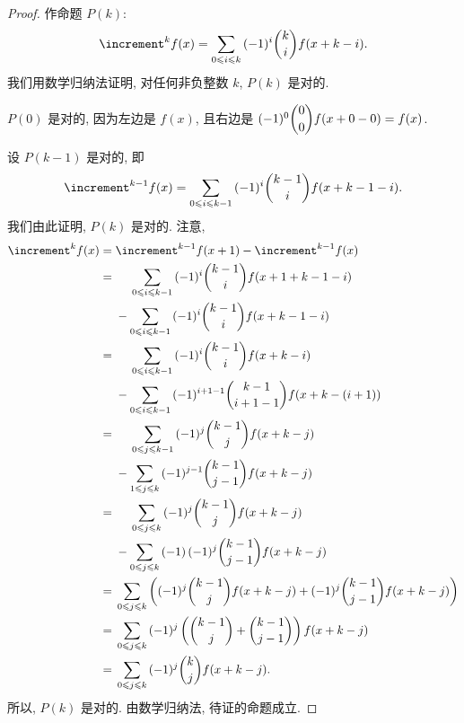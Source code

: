 \documentclass[../libro.tex]{subfiles}
\begin{document}
\begin{proof}
    作命题 \(P(k)\):
    \begin{align*}
        \increment^k f (x)
        = \sum_{0 \leq i \leq k} {(-1)^i \dbinom{k}{i} f(x + k - i)}.
    \end{align*}
    我们用数学归纳法证明, 对任何非负整数 \(k\),
    \(P(k)\) 是对的.

    \(P(0)\) 是对的, 因为左边是 \(f(x)\),
    且右边是 \((-1)^0 \dbinom{0}{0} f(x + 0 - 0) = f(x)\).

    设 \(P(k-1)\) 是对的,
    即
    \begin{align*}
        \increment^{k-1} f (x)
        = \sum_{0 \leq i \leq k-1} {(-1)^i \dbinom{k-1}{i} f(x + k - 1 - i)}.
    \end{align*}
    我们由此证明, \(P(k)\) 是对的.
    注意,
    \begin{align*}
        \increment^k f(x)
        = {} &
        \increment^{k-1} f (x+1) - \increment^{k-1} f (x)
        \\
        = {} &
        \hphantom{{} - {}}
        \sum_{0 \leq i \leq k-1} {(-1)^i \dbinom{k-1}{i} f(x + 1 + k - 1 - i)}
        \\
        &
        {} -
        \sum_{0 \leq i \leq k-1} {(-1)^i \dbinom{k-1}{i} f(x + k - 1 - i)}
        \\
        = {} &
        \hphantom{{} - {}}
        \sum_{0 \leq i \leq k-1} {(-1)^i \dbinom{k-1}{i} f(x + k - i)}
        \\
        &
        {} -
        \sum_{0 \leq i \leq k-1} {(-1)^{i+1-1} \dbinom{k-1}{i+1-1} f(x + k - (i + 1))}
        \\
        = {} &
        \hphantom{{} + {}}
        \sum_{0 \leq j \leq k-1} {(-1)^j \dbinom{k-1}{j} f(x + k - j)}
        \\
        &
        {} -
        \sum_{1 \leq j \leq k} {(-1)^{j-1} \dbinom{k-1}{j-1} f(x + k - j)}
        \\
        = {} &
        \hphantom{{} + {}}
        \sum_{0 \leq j \leq k} {(-1)^j \dbinom{k-1}{j} f(x + k - j)}
        \\
        &
        {} -
        \sum_{0 \leq j \leq k} {(-1)\, (-1)^j \dbinom{k-1}{j-1} f(x + k - j)}
        \\
        = {} &
        \sum_{0 \leq j \leq k}
        {\left((-1)^j \dbinom{k-1}{j} f(x + k - j)
        + (-1)^j \dbinom{k-1}{j-1} f(x + k - j)\right)}
        \\
        = {} &
        \sum_{0 \leq j \leq k}
        {(-1)^j \left(
                \dbinom{k-1}{j} + \dbinom{k-1}{j-1}
        \right) f(x + k - j)}
        \\
        = {} &
        \sum_{0 \leq j \leq k}
        {(-1)^j \dbinom{k}{j} f(x + k - j)}.
    \end{align*}
    所以, \(P(k)\) 是对的.
    由数学归纳法, 待证的命题成立.
\end{proof}
\end{document}
